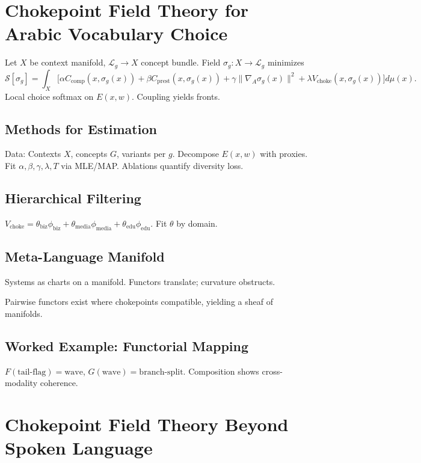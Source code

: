\documentclass[12pt]{article}
\begin{document}
\section{Chokepoint Field Theory for Arabic Vocabulary Choice}
\label{app:vocabulary}
Let $X$ be context manifold, $\mathcal{L}_g \to X$ concept bundle. Field $\sigma_g: X \to \mathcal{L}_g$ minimizes
\[
\mathcal{S}[\sigma_g] = \int_X \big[ \alpha C_{\text{comp}}(x,\sigma_g(x)) + \beta C_{\text{prest}}(x,\sigma_g(x)) + \gamma \|\nabla_A \sigma_g(x)\|^2 + \lambda V_{\text{choke}}(x,\sigma_g(x)) \big] d\mu(x).
\]
Local choice softmax on $E(x,w)$. Coupling yields fronts.

\subsection{Methods for Estimation}
Data: Contexts $X$, concepts $G$, variants per $g$. Decompose $E(x,w)$ with proxies. Fit $\alpha,\beta,\gamma,\lambda,T$ via MLE/MAP. Ablations quantify diversity loss.

\subsection{Hierarchical Filtering}
$V_{\text{choke}} = \theta_{\text{biz}} \phi_{\text{biz}} + \theta_{\text{media}} \phi_{\text{media}} + \theta_{\text{edu}} \phi_{\text{edu}}$. Fit $\theta$ by domain.

\subsection{Meta-Language Manifold}
Systems as charts on a manifold. Functors translate; curvature obstructs.

\begin{theorem*}[Universality]
Pairwise functors exist where chokepoints compatible, yielding a sheaf of manifolds.
\end{theorem*}

\subsection{Worked Example: Functorial Mapping}
$F(\text{tail-flag}) = \text{wave}$, $G(\text{wave}) = \text{branch-split}$. Composition shows cross-modality coherence.

\section{Chokepoint Field Theory Beyond Spoken Language}
\label{app:gestural}
\end{document}

